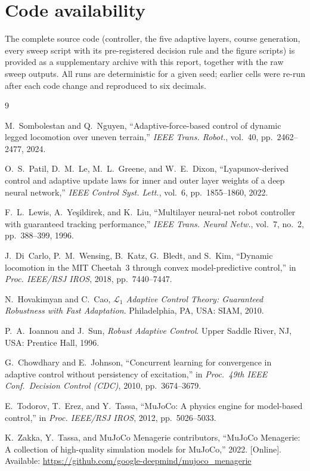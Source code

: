 \documentclass[conference]{IEEEtran}
\begin{document}
\section*{Code availability}
The complete source code (controller, the five adaptive layers, course
generation, every sweep script with its pre-registered decision rule and
the figure scripts) is provided as a supplementary archive with this
report, together with the raw sweep outputs. All runs are deterministic
for a given seed; earlier cells were re-run after each code change and
reproduced to six decimals.

\begin{thebibliography}{9}

M.~Sombolestan and Q.~Nguyen, ``Adaptive-force-based control of dynamic
legged locomotion over uneven terrain,'' \emph{IEEE Trans. Robot.},
vol.~40, pp.~2462--2477, 2024.

O.~S.~Patil, D.~M.~Le, M.~L.~Greene, and W.~E.~Dixon, ``Lyapunov-derived
control and adaptive update laws for inner and outer layer weights of a
deep neural network,'' \emph{IEEE Control Syst. Lett.}, vol.~6,
pp.~1855--1860, 2022.

F.~L.~Lewis, A.~Ye\c{s}ildirek, and K.~Liu, ``Multilayer neural-net robot
controller with guaranteed tracking performance,'' \emph{IEEE Trans.
Neural Netw.}, vol.~7, no.~2, pp.~388--399, 1996.

J.~Di~Carlo, P.~M.~Wensing, B.~Katz, G.~Bledt, and S.~Kim, ``Dynamic
locomotion in the MIT Cheetah~3 through convex model-predictive
control,'' in \emph{Proc. IEEE/RSJ IROS}, 2018, pp.~7440--7447.

N.~Hovakimyan and C.~Cao, \emph{$\mathcal{L}_1$ Adaptive Control
Theory: Guaranteed Robustness with Fast Adaptation}. Philadelphia, PA, USA: SIAM, 2010.

P.~A.~Ioannou and J.~Sun, \emph{Robust Adaptive Control}. Upper Saddle
River, NJ, USA: Prentice Hall, 1996.

G.~Chowdhary and E.~Johnson, ``Concurrent learning for convergence in
adaptive control without persistency of excitation,'' in \emph{Proc.\
49th IEEE Conf.\ Decision Control (CDC)}, 2010, pp.~3674--3679.

E.~Todorov, T.~Erez, and Y.~Tassa, ``MuJoCo: A physics engine for
model-based control,'' in \emph{Proc. IEEE/RSJ IROS}, 2012,
pp.~5026--5033.

K.~Zakka, Y.~Tassa, and MuJoCo Menagerie contributors, ``MuJoCo
Menagerie: A collection of high-quality simulation models for MuJoCo,''
2022. [Online]. Available: \url{https://github.com/google-deepmind/mujoco_menagerie}

\end{thebibliography}
\end{document}
